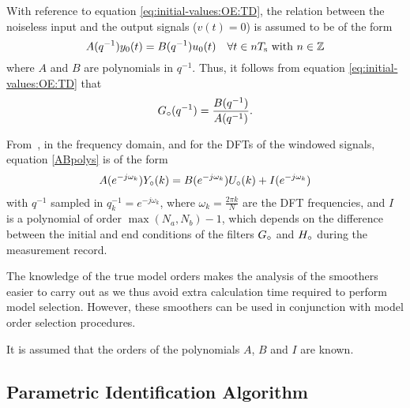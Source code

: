 With reference to equation \eqref{eq:initial-values:OE:TD}, the relation between the noiseless input and the output signals ($v(t)= 0$) is assumed to be of the form
\begin{equation}
    A(q^{-1}) y_0(t) = B(q^{-1}) u_0(t) \quad \forall t \in n T_{\mathrm{s}}{}  \text{ with }  n \in \mathbb{Z}
\label{ABpolys}
\end{equation}
where $A$ and $B$ are polynomials in $q^{-1}$. 
Thus, it follows from equation \eqref{eq:initial-values:OE:TD} that
\begin{equation}
    {G}_{\circ}(q^{-1})= \frac{B(q^{-1})}{A(q^{-1})}
    \text{.}
\end{equation}

From~\citet[Section 6.3.2.]{Pintelon2012}, in the frequency domain, and for the \glspl{DFT} of the windowed signals, equation \eqref{ABpolys} is of the form
\begin{align}
A(e^{-j\omega_k}){Y}_{\circ}(k) = B(e^{-j\omega_k}){U}_{\circ}(k) + I(e^{-j\omega_k})
\label{DFTspectra}
\end{align}
with $q^{-1}$ sampled in  $q_k^{-1} = e^{-j\omega_k}$, where $\omega_k = \frac{2\pi k}{N}$ are the \gls{DFT} frequencies, and $I$ is a polynomial of order $\max(N_a,N_b) - 1$, which depends on the difference between the initial and end conditions of the filters ${G}_{\circ}$ and ${H}_{\circ}$ during the measurement record.

\begin{remark}
The knowledge of the true model orders makes the analysis of the smoothers easier to carry out as we thus avoid extra calculation time required to perform model selection.
However, these smoothers can be used in conjunction with model order selection procedures.
\end{remark}

\begin{assumption}
It is assumed that the orders of the polynomials $A$, $B$ and $I$ are known.
\end{assumption}


\subsection{Parametric Identification Algorithm}\label{sec:initial-values:paramIdentAlgo}

